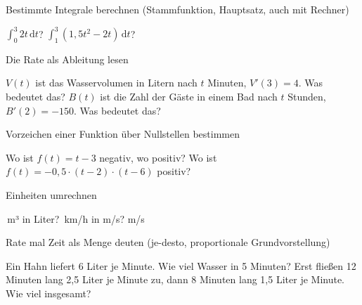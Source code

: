 \setcounter{aufgabe}{0}

\begin{aufgabe}{Bestimmte Integrale berechnen (Stammfunktion, Hauptsatz, auch mit Rechner)}
\begin{teile}
\teil $∫_0^3 2t\,\mathrm{d}t$? \leerfeld
\teil $∫_1^3 (1{,}5t^2 - 2t)\,\mathrm{d}t$? \leerfeld
\end{teile}
\end{aufgabe}

\begin{aufgabe}{Die Rate als Ableitung lesen}
\begin{teile}
\teil $V(t)$ ist das Wasservolumen in Litern nach $t$ Minuten, $V'(3) = 4$. Was bedeutet das?
\teil $B(t)$ ist die Zahl der Gäste in einem Bad nach $t$ Stunden, $B'(2) = -150$. Was bedeutet das?
\end{teile}
\end{aufgabe}

\begin{aufgabe}{Vorzeichen einer Funktion über Nullstellen bestimmen}
\begin{teile}
\teil Wo ist $f(t) = t - 3$ negativ, wo positiv?
\teil Wo ist $f(t) = -0{,}5 \cdot (t - 2) \cdot (t - 6)$ positiv?
\end{teile}
\end{aufgabe}

\begin{aufgabe}{Einheiten umrechnen}
\begin{teile}
\,m³ in Liter? \leerfeld[l]
\,km/h in m/s? \leerfeld m/s
\end{teile}
\end{aufgabe}

\begin{aufgabe}{Rate mal Zeit als Menge deuten (je-desto, proportionale Grundvorstellung)}
\begin{teile}
\teil Ein Hahn liefert 6 Liter je Minute. Wie viel Wasser in 5 Minuten? \leerfeld[l]
\teil Erst fließen 12 Minuten lang 2{,}5 Liter je Minute zu, dann 8 Minuten lang 1{,}5 Liter je Minute. Wie viel insgesamt? \leerfeld[l]
\end{teile}
\end{aufgabe}

